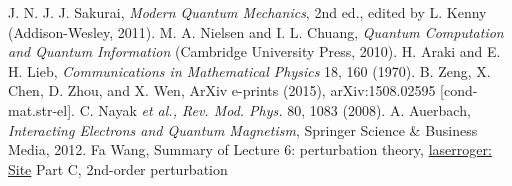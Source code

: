 \begin{thebibliography}{99}
J. N. J. J. Sakurai, \textsl{Modern Quantum Mechanics}, 2nd ed., edited by L. Kenny (Addison-Wesley, 2011).
M. A. Nielsen and I. L. Chuang, \textsl{Quantum Computation and Quantum Information} (Cambridge University Press, 2010).
H. Araki and E. H. Lieb, \textsl{Communications in Mathematical Physics} 18, 160 (1970).
B. Zeng, X. Chen, D. Zhou, and X. Wen, ArXiv e-prints (2015), arXiv:1508.02595 [cond-mat.str-el].
C. Nayak \textsl{et al., Rev. Mod. Phys.} 80, 1083 (2008).
A. Auerbach, \textsl{Interacting Electrons and Quantum Magnetism}, Springer Science \& Business Media, 2012.
Fa Wang, Summary of Lecture 6: perturbation theory, \href{http://laserroger.github.io/PekingPhysics/ADVQM2014/Lectures/Lecture06.pdf}{laserroger: Site} Part C, 2nd-order perturbation
\end{thebibliography}
